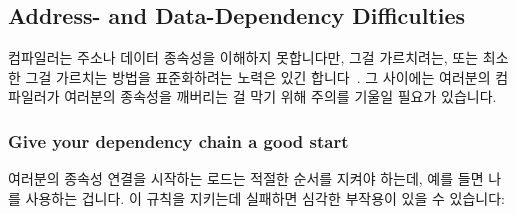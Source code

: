\fi

\subsection{Address- and Data-Dependency Difficulties}
\label{sec:memorder:Address- and Data-Dependency Difficulties}

컴파일러는 주소나 데이터 종속성을 이해하지 못합니다만, 그걸 가르치려는, 또는
최소한 그걸 가르치는 방법을 표준화하려는 노력은 있긴
합니다~\cite{PaulEMcKennneyConsumeP0190R4,PaulEMcKenney2017markconsumeP0462R1}.
그 사이에는 여러분의 컴파일러가 여러분의 종속성을 깨버리는 걸 막기 위해 주의를
기울일 필요가 있습니다.

\subsubsection{Give your dependency chain a good start}
여러분의 종속성 연결을 시작하는 로드는 적절한 순서를 지켜야 하는데, 예를 들면
 나  를 사용하는 겁니다.
이 규칙을 지키는데 실패하면 심각한 부작용이 있을 수 있습니다:

